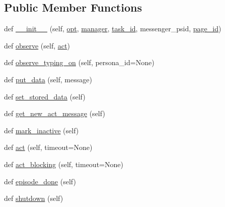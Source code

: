 \subsection*{Public Member Functions}
\begin{DoxyCompactItemize}
\item 
def \hyperlink{classparlai_1_1messenger_1_1core_1_1agents_1_1MessengerAgent_af43e5d7c706bd30363254752ac3cd2eb}{\+\_\+\+\_\+init\+\_\+\+\_\+} (self, \hyperlink{classparlai_1_1core_1_1agents_1_1Agent_ab3b45d2754244608c75d4068b90cd051}{opt}, \hyperlink{classparlai_1_1messenger_1_1core_1_1agents_1_1MessengerAgent_a9fd8bad20f0717092f529c8f9ed7df94}{manager}, \hyperlink{classparlai_1_1messenger_1_1core_1_1agents_1_1MessengerAgent_a1e5058b5b6b5d3695647e87aac51d59d}{task\+\_\+id}, messenger\+\_\+psid, \hyperlink{classparlai_1_1messenger_1_1core_1_1agents_1_1MessengerAgent_ac944940796b2b11dfb38eb683cca9222}{page\+\_\+id})
\item 
def \hyperlink{classparlai_1_1messenger_1_1core_1_1agents_1_1MessengerAgent_a271b952ab42ea1c7746fad4c8758295d}{observe} (self, \hyperlink{classparlai_1_1messenger_1_1core_1_1agents_1_1MessengerAgent_af7b11c26980cc2fec3952470c73d5dff}{act})
\item 
def \hyperlink{classparlai_1_1messenger_1_1core_1_1agents_1_1MessengerAgent_a692e3ce71bc6c4f8842540049d0e2cae}{observe\+\_\+typing\+\_\+on} (self, persona\+\_\+id=None)
\item 
def \hyperlink{classparlai_1_1messenger_1_1core_1_1agents_1_1MessengerAgent_acb0bd315f2b41ac178f5ec91a2d01f83}{put\+\_\+data} (self, message)
\item 
def \hyperlink{classparlai_1_1messenger_1_1core_1_1agents_1_1MessengerAgent_a3a82460eeeb7928bbf0cd4d0cbde603a}{set\+\_\+stored\+\_\+data} (self)
\item 
def \hyperlink{classparlai_1_1messenger_1_1core_1_1agents_1_1MessengerAgent_afc5f00a73bd86a16176ca5bcc819a51b}{get\+\_\+new\+\_\+act\+\_\+message} (self)
\item 
def \hyperlink{classparlai_1_1messenger_1_1core_1_1agents_1_1MessengerAgent_a43a586dd11aed8d84b60cffd9a1a27ac}{mark\+\_\+inactive} (self)
\item 
def \hyperlink{classparlai_1_1messenger_1_1core_1_1agents_1_1MessengerAgent_af7b11c26980cc2fec3952470c73d5dff}{act} (self, timeout=None)
\item 
def \hyperlink{classparlai_1_1messenger_1_1core_1_1agents_1_1MessengerAgent_a50d76f90d1926c160d96e621403b7598}{act\+\_\+blocking} (self, timeout=None)
\item 
def \hyperlink{classparlai_1_1messenger_1_1core_1_1agents_1_1MessengerAgent_a65b80577fae01c90fae6c3613cb98205}{episode\+\_\+done} (self)
\item 
def \hyperlink{classparlai_1_1messenger_1_1core_1_1agents_1_1MessengerAgent_ab05d902c8b1a918672341091353d1f9c}{shutdown} (self)
\end{DoxyCompactItemize}
